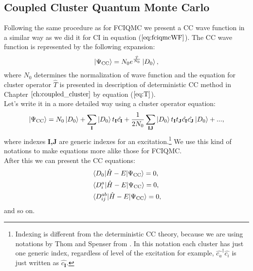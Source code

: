 \documentclass[twoside,english]{uiofysmaster}
\theoremstyle{definition}
\begin{document}
\subsection{Coupled Cluster Quantum Monte Carlo}
Following the same procedure as for FCIQMC we present a CC wave function in a similar way as we did it for CI in equation ($\ref{eq:fciqmcWF}$). The CC wave function is represented by the following expansion:
\begin{equation}\label{eq:ccqmcWF}
\ket{\Psi_{\text{CC}}}= N_0 e^{\frac{\hat{T}}{N_0}}\ket{D_0},
\end{equation}
where $N_0$ determines the normalization of wave function and the equation for cluster operator $\hat{T}$ is presented in description of deterministic CC method in Chapter $\ref{ch:coupled_cluster}$ by equation ($\ref{eq:T}$). \\
Let's write it in a more detailed way using a cluster operator equation:
\begin{align}
\ket{\Psi_{\text{CC}}}=N_0\ket{D_0} + \sum_{\textbf{I}} \ket{D_0} t_\textbf{I} \hat{c_\textbf{I}} + \frac{1}{2N_0}
 \sum_{\textbf{IJ}} \ket{D_0} t_\textbf{I} t_\textbf{J}\hat{c_\textbf{I}} \hat{c_\textbf{J}}\ket{D_0} + ...,
\end{align}
where indexes \textbf{I,J} are generic indexes for an excitation.\footnote{Indexing is different from the deterministic CC theory, because we are using notations by Thom and Spenser from \cite{spencerDevelopmentsStochasticCoupled2016}. In this notation each cluster has just one generic index, regardless of level of the excitation for example, $ \hat{c_a}^\dagger \hat{c_i}$ is just written as $\hat{c_\textbf{I}}$.} We use this kind of notations to make equations more alike those for FCIQMC.\\ 
After this we can present the CC equations:
\begin{align}\label{eq:CCQMC1}
&\braket{D_0|\hat{H}-E|\Psi_{\text{CC}}}=0,\\
&\braket{D_i^a|\hat{H}-E|\Psi_{\text{CC}}}=0,\\
&\braket{D_{ij}^{ab}|\hat{H}-E|\Psi_{\text{CC}}}=0,\\
\end{align} 
and so on.\\
\end{document}
